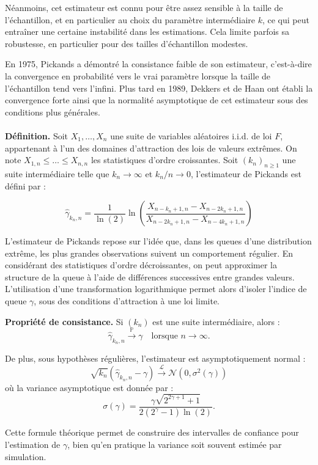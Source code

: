 \documentclass{article}
\theoremstyle{plain}
\theoremstyle{definition}
\theoremstyle{plain}
\begin{document}
Néanmoins, cet estimateur est connu pour être assez sensible à la taille de l’échantillon, et en particulier au choix du paramètre intermédiaire \(k\), ce qui peut entraîner une certaine instabilité dans les estimations. Cela limite parfois sa robustesse, en particulier pour des tailles d’échantillon modestes.

En 1975, Pickands a démontré la consistance faible de son estimateur, c’est-à-dire la convergence en probabilité vers le vrai paramètre lorsque la taille de l’échantillon tend vers l’infini. Plus tard en 1989, Dekkers et de Haan ont établi la convergence forte ainsi que la normalité asymptotique de cet estimateur sous des conditions plus générales.
\\
\\
\medskip
\textbf{Définition.} Soit \(X_1, \dots, X_n\) une suite de variables aléatoires i.i.d. de loi \(F\), appartenant à l’un des domaines d’attraction des lois de valeurs extrêmes. On note \(X_{1,n} \leq \dots \leq X_{n,n}\) les statistiques d’ordre croissantes. Soit \((k_n)_{n \geq 1}\) une suite intermédiaire telle que \(k_n \to \infty\) et \(k_n / n \to 0\), l’estimateur de Pickands est défini par :

\[
\hat{\gamma}_{k_n,n} = \frac{1}{\ln(2)} \ln\left( \frac{X_{n-k_n +1,n} - X_{n-2k_n +1,n}}{X_{n-2k_n +1,n} - X_{n-4k_n +1,n}} \right)
\]

\medskip
L’estimateur de Pickands repose sur l’idée que, dans les queues d’une distribution extrême, les plus grandes observations suivent un comportement régulier. En considérant des statistiques d’ordre décroissantes, on peut approximer la structure de la queue à l’aide de différences successives entre grandes valeurs. L’utilisation d’une transformation logarithmique permet alors d’isoler l’indice de queue \(\gamma\), sous des conditions d’attraction à une loi limite.

\medskip
\textbf{Propriété de consistance.} Si \((k_n)\) est une suite intermédiaire, alors :
\[
\hat{\gamma}_{k_n,n} \xrightarrow{\mathbb{P}} \gamma
\quad \text{lorsque } n \to \infty.
\]

De plus, sous hypothèses régulières, l’estimateur est asymptotiquement normal :
\[
\sqrt{k_n} \left( \hat{\gamma}_{k_n,n} - \gamma \right) \xrightarrow{\mathcal{L}} \mathcal{N}(0, \sigma^2(\gamma))
\]
où la variance asymptotique est donnée par :
\[
\sigma(\gamma) = \frac{\gamma \sqrt{2^{2\gamma + 1} + 1}}{2(2^{\gamma} - 1)\ln(2)}.
\]

\medskip
Cette formule théorique permet de construire des intervalles de confiance pour l’estimation de \(\gamma\), bien qu’en pratique la variance soit souvent estimée par simulation.
\end{document}
